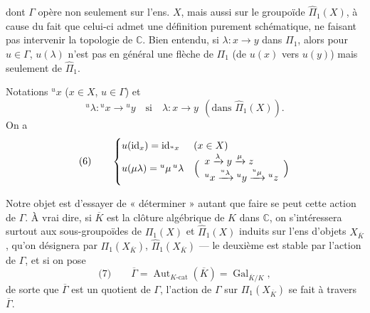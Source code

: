 \documentclass[11pt,a4paper]{article}
\begin{document}
dont $\Gamma$ opère non seulement sur  l'ens. $X$, mais aussi sur le groupoïde $\widehat{\Pi}_1(X)$, à cause du fait que celui-ci admet une définition purement schématique, ne faisant pas intervenir la topologie de $\mathbb{C}$. Bien entendu, si $\lambda : x \to y$ dans $\Pi_1$, alors pour $u \in \Gamma$, $u(\lambda)$ n'est pas en général une flèche de $\Pi_1$ (de $u(x)$ vers $u(y)$) mais seulement de $\widehat{\Pi}_1$.

 Notations ${}^{u}x$ ($x \in X$, $u \in \Gamma$) et
\[
{}^{u}\lambda : {}^{u}x \longrightarrow {}^{u}y \quad\text{si}\quad \lambda : x \to y \ \ (\text{dans } \widehat{\Pi}_1(X)) .
\]
On a
\[
\text{(6)}\qquad
\begin{cases}
u(\mathrm{id}_x) = \mathrm{id}_{{}^{u}x} & (x \in X)\\
u(\mu\lambda) = {}^{u}\mu\,{}^{u}\lambda & \Bigl(\begin{array}{l} x \xrightarrow{\lambda} y \xrightarrow{\mu} z \\ {}^{u}x \xrightarrow{{}^{u}\lambda} {}^{u}y \xrightarrow{{}^{u}\mu} {}^{u}z \end{array}\Bigr)
\end{cases}
\]

Notre objet est d'essayer de « déterminer » autant que faire se peut cette action de $\Gamma$. À vrai dire, si $\overline{K}$ est la clôture algébrique de $K$ dans $\mathbb{C}$, on s'intéressera surtout aux sous-groupoïdes de $\Pi_1(X)$ et $\widehat{\Pi}_1(X)$ induits sur l'ens d'objets $X_{\overline{K}}$, qu'on désignera par $\Pi_1(X_{\overline{K}})$, $\widehat{\Pi}_1(X_{\overline{K}})$ — le deuxième est stable par l'action de $\Gamma$, et si on pose
\[
\text{(7)}\qquad \overline{\Gamma} = \operatorname{Aut}_{K\text{-cat}}(\overline{K}) = \operatorname{Gal}_{\overline{K}/K} ,
\]
de sorte que $\overline{\Gamma}$ est un quotient de $\Gamma$, l'action de $\Gamma$ sur $\Pi_1(X_{\overline{K}})$ se fait à travers $\overline{\Gamma}$.
\end{document}
